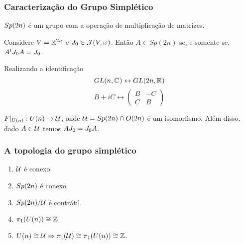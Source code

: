 \documentclass{beamer}
\begin{document}
\begin{footnotesize}
\begin{frame}
	\end{frame}
	
	\begin{frame}
		\frametitle{Caracterização do Grupo Simplético}
		\begin{proposicao}
			$Sp(2n)$ é um grupo com a operação de multiplicação de matrizes.
		\end{proposicao}
		
		\begin{lema}[Caracterização de $Sp(2n)$]
			 Considere $V = \mathbb{R}^{2n}$ e $J_{0} \in \mathcal{J}(V, \omega)$. Então $A\in Sp(2n)$ se, e somente se, $A^{t}J_{0} A = J_{0}$.
		\end{lema}
		
		Realizando a identificação
		$$
		GL(n, \mathbb{C}^{})\leftrightarrow GL(2n, \mathbb{R}^{})
		$$
		$$
		B+iC \leftrightarrow
		\left(
		\begin{array}{cc}
		B & -C
		\\
		C & B
		\end{array}
		\right)
		$$  
		\begin{lema}
			$F|_{U(n)}: U(n) \to \mathcal{U} $, onde $\mathcal{U}  = Sp(2n)\cap O(2n)$ é um isomorfismo. Além disso, dado $A \in \mathcal{U} $ temos $AJ_{0}=J_{0} A$.
		\end{lema}
	\end{frame}
		
	\begin{frame}
		\frametitle{A topologia do grupo simplético}
		
		\begin{enumerate}
			\item $\mathcal{U}$ é conexo
			
			\item $Sp(2n)$ é conexo
			
			\item $Sp(2n)/\mathcal{U}$ é contrátil.
			
			\item  $\pi_{1}(U(n)) \cong \mathbb{Z}$
			
			\item $U(n) \cong \mathcal{U} \Rightarrow \pi_{1}(\mathcal{U}) \cong \pi_{1}(U(n)) \cong \mathbb{Z}$.
			

\end{enumerate}
\end{frame}
\end{footnotesize}
\end{document}
